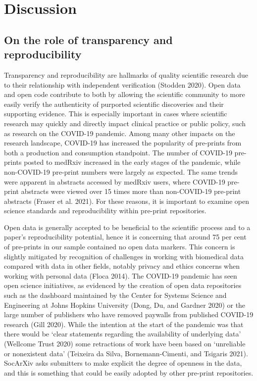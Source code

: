 \documentclass[
]{article}
\begin{document}
\hypertarget{discussion}{%
\section{Discussion}\label{discussion}}

\hypertarget{on-the-role-of-transparency-and-reproducibility}{%
\subsection{On the role of transparency and reproducibility}\label{on-the-role-of-transparency-and-reproducibility}}

Transparency and reproducibility are hallmarks of quality scientific research due to their relationship with independent verification (Stodden 2020). Open data and open code contribute to both by allowing the scientific community to more easily verify the authenticity of purported scientific discoveries and their supporting evidence. This is especially important in cases where scientific research may quickly and directly impact clinical practice or public policy, such as research on the COVID-19 pandemic. Among many other impacts on the research landscape, COVID-19 has increased the popularity of pre-prints from both a production and consumption standpoint. The number of COVID-19 pre-prints posted to medRxiv increased in the early stages of the pandemic, while non-COVID-19 pre-print numbers were largely as expected. The same trends were apparent in abstracts accessed by medRxiv users, where COVID-19 pre-print abstracts were viewed over 15 times more than non-COVID-19 pre-print abstracts (Fraser et al. 2021). For these reasons, it is important to examine open science standards and reproducibility within pre-print repositories.

Open data is generally accepted to be beneficial to the scientific process and to a paper's reproducibility potential, hence it is concerning that around 75 per cent of pre-prints in our sample contained no open data markers. This concern is slightly mitigated by recognition of challenges in working with biomedical data compared with data in other fields, notably privacy and ethics concerns when working with personal data (Floca 2014). The COVID-19 pandemic has seen open science initiatives, as evidenced by the creation of open data repositories such as the dashboard maintained by the Center for Systems Science and Engineering at Johns Hopkins University (Dong, Du, and Gardner 2020) or the large number of publishers who have removed paywalls from published COVID-19 research (Gill 2020). While the intention at the start of the pandemic was that there would be `clear statements regarding the availability of underlying data' (Wellcome Trust 2020) some retractions of work have been based on `unreliable or nonexistent data' (Teixeira da Silva, Bornemann-Cimenti, and Tsigaris 2021). SocArXiv asks submitters to make explicit the degree of openness in the data, and this is something that could be easily adopted by other pre-print repositories.
\end{document}
